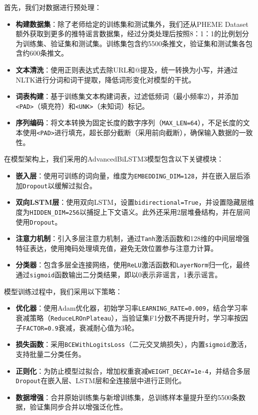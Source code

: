 \vspace{1em}
首先，我们对数据进行预处理：
\begin{itemize}
    \item \textbf{构建数据集}：除了老师给定的训练集和测试集外，我们还从PHEME Dataset额外获取到更多的推特谣言数据集，经过分类处理后按照8：1：1的比例划分为训练集、验证集和测试集。训练集包含约5500条推文，验证集和测试集各包含约600条推文。
    \item \textbf{文本清洗}：使用正则表达式去除URL和@提及，统一转换为小写，并通过NLTK进行分词和词干提取，降低词形变化对模型的干扰。
    \item \textbf{词表构建}：基于训练集文本构建词表，过滤低频词（最小频率2），并添加\verb|<PAD>|（填充符）和\verb|<UNK>|（未知词）标记。
    \item \textbf{序列编码}：将文本转换为固定长度的数字序列（\verb|MAX_LEN=64|），不足长度的文本使用\verb|<PAD>|进行填充，超长部分截断（采用前向截断），确保输入数据的一致性。
\end{itemize}

\vspace{1em}
在模型架构上，我们采用的AdvancedBiLSTM3模型包含以下关键模块：
\begin{itemize}
    \item \textbf{嵌入层}：使用可训练的词向量，维度为\verb|EMBEDDING_DIM=128|，并在嵌入层后添加\verb|Dropout|以缓解过拟合。
    \item \textbf{双向LSTM层}：使用双向LSTM，设置\verb|bidirectional=True|，并设置隐藏层维度为\verb|HIDDEN_DIM=256|以捕捉上下文语义。此外还采用2层堆叠结构，并在层间使用\verb|Dropout|。
    \item \textbf{注意力机制}：引入多层注意力机制，通过\verb|Tanh|激活函数和128维的中间层增强特征表达，使用掩码处理填充值，避免无效位置参与注意力计算。
    \item \textbf{分类器}：包含多层全连接网络，使用\verb|ReLU|激活函数和\verb|LayerNorm|归一化，最终通过\verb|sigmoid|函数输出二分类结果，即以0表示非谣言，1表示谣言。
\end{itemize}

\vspace{1em}
模型训练过程中，我们采用以下策略：
\begin{itemize}
    \item \textbf{优化器}：使用Adam优化器，初始学习率\verb|LEARNING_RATE=0.009|，结合学习率衰减策略（\verb|ReduceLROnPlateau|），当验证集F1分数不再提升时，学习率按因子\verb|FACTOR=0.9|衰减，衰减耐心值为3轮。
    \item \textbf{损失函数}：采用\verb|BCEWithLogitsLoss|（二元交叉熵损失），内置\verb|sigmoid|激活，支持批量二分类任务。
    \item \textbf{正则化}：为防止模型过拟合，增加权重衰减\verb|WEIGHT_DECAY=1e-4|，并结合多层\verb|Dropout|在嵌入层、LSTM层和全连接层中进行正则化。
    \item \textbf{数据增强}：合并原始训练集与新增训练集，总训练样本量提升至约5500条数据，验证集同步合并以增强泛化性。
\end{itemize}  

